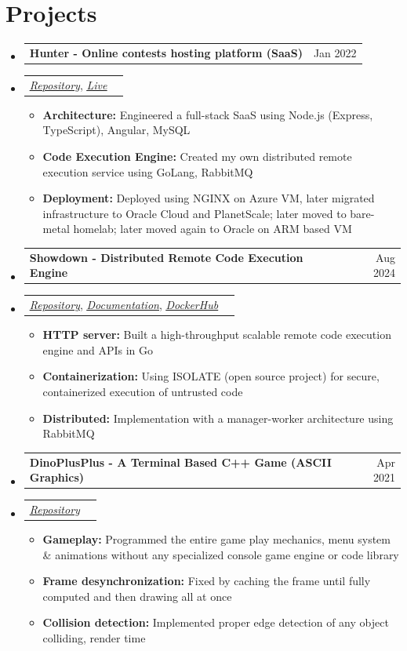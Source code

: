 \documentclass[letterpaper,11pt]{article}
\makeatletter
\newcommand{\resumeItem}[1]{
  \item\small{
    {#1 \vspace{-2pt}}
  }
}
\newcommand{\resumeProjectHeading}[2]{
    \item
    \begin{tabular*}{0.97\textwidth}{l@{\extracolsep{\fill}}r}
      \small#1 & #2 \\
    \end{tabular*}\vspace{-7pt}
}
\newcommand{\resumeSubHeadingListStart}{\begin{itemize}[leftmargin=0.15in, label={}]}
\newcommand{\resumeSubHeadingListEnd}{\end{itemize}}
\newcommand{\resumeItemListStart}{\begin{itemize}}
\newcommand{\resumeItemListEnd}{\end{itemize}\vspace{-5pt}}
\makeatother
\begin{document}
\section{Projects}
    \resumeSubHeadingListStart
      \resumeProjectHeading{{\textbf{Hunter - Online contests hosting platform (SaaS)}}}{Jan 2022}
      \resumeProjectHeading{\href{https://github.com/msc24x/hunter}{\emph{\underline{Repository}}}, \href{https://hunter.cambo.in}{\emph{\underline{Live}}}}{}
          \resumeItemListStart
            \resumeItem{\textbf{Architecture:} Engineered a full-stack SaaS using Node.js (Express, TypeScript), Angular, MySQL}
            \resumeItem{\textbf{Code Execution Engine:} Created my own distributed remote execution service using GoLang, RabbitMQ}
            \resumeItem{\textbf{Deployment:} Deployed using NGINX on Azure VM, later migrated infrastructure to Oracle Cloud and PlanetScale; later moved to bare-metal homelab; later moved again to Oracle on ARM based VM}
          \resumeItemListEnd
      \resumeProjectHeading{{\textbf{Showdown - Distributed Remote Code Execution Engine}}}{Aug 2024}
      \resumeProjectHeading{\href{https://github.com/msc24x/showdown}{\emph{\underline{Repository}}}, \href{https://showdown.cambo.in/}{\emph{\underline{Documentation}}}, \href{https://hub.docker.com/r/msc24x/showdown}{\emph{\underline{DockerHub}}}}{}
          \resumeItemListStart
            \resumeItem{\textbf{HTTP server:} Built a high-throughput scalable remote code execution engine and APIs in Go}
            \resumeItem{\textbf{Containerization:} Using ISOLATE (open source project) for secure, containerized execution of untrusted code}
            \resumeItem{\textbf{Distributed:} Implementation with a manager-worker architecture using RabbitMQ}
          \resumeItemListEnd
      \resumeProjectHeading{{\textbf{DinoPlusPlus - A Terminal Based C++ Game (ASCII Graphics)}}}{Apr 2021}
      \resumeProjectHeading{\href{https://github.com/msc24x/dinoplusplus}{\emph{\underline{Repository}}}}{}
          \resumeItemListStart
            \resumeItem{\textbf{Gameplay:} Programmed the entire game play mechanics, menu system \& animations without any specialized console game engine or code library}
            \resumeItem{\textbf{Frame desynchronization:} Fixed by caching the frame until fully computed and then drawing all at once}
            \resumeItem{\textbf{Collision detection:} Implemented proper edge detection of any object colliding, render time}
          \resumeItemListEnd
    \resumeSubHeadingListEnd
\end{document}

